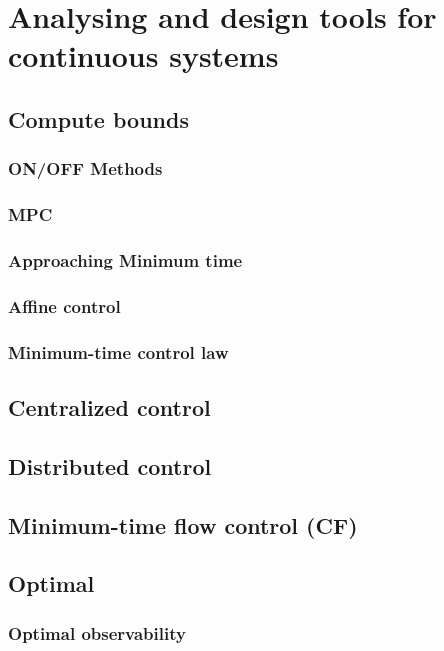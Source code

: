 \section{Analysing and design tools for continuous systems}

\subsection{Compute bounds}

\subsubsection{ON/OFF Methods}
\cite{ONOFFmethodsWANG2014}
\subsubsection{MPC}

\subsubsection{Approaching Minimum time}

\subsubsection{Affine control}

\subsubsection{Minimum-time control law}

\subsection{Centralized control}

\subsection{Distributed control}

\subsection{Minimum-time flow control (CF)}

\subsection{Optimal}
\subsubsection{Optimal observability}
